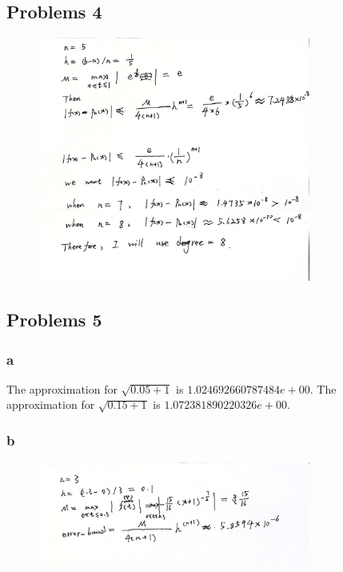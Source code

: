 \documentclass[11pt,fleqn]{exam}
\begin{document}
\subsection*{Problems 4}
\begin{figure}[hbt!]
  	\centering
  	\includegraphics[width=0.8\textwidth]{q4}
\end{figure}

\subsection*{Problems 5}


\subsubsection*{a}
The approximation for $\sqrt{0.05+1}$ is $1.024692660787484e+00$.
The approximation for $\sqrt{0.15+1}$ is $1.072381890220326e+00$.

\subsubsection*{b}
\begin{figure}[hbt!]
  	\centering
  	\includegraphics[width=0.8\textwidth]{q5_b}
\end{figure}
\end{document}
